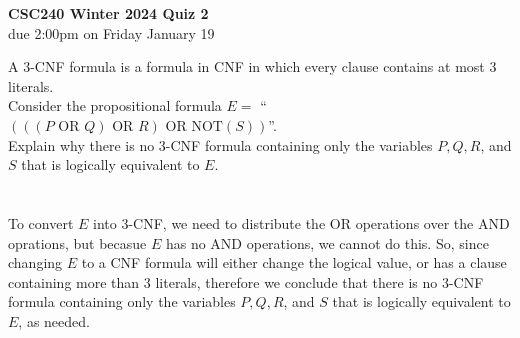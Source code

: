 \documentclass[11pt]{article}
\begin{document}
\begin{center}
{\bf \Large \bf CSC240 Winter 2024 Quiz 2}\\
due 2:00pm on Friday January 19 
\end{center}



A 3-CNF formula is a formula in CNF in which every clause contains at most 3 literals.\\

Consider the propositional formula  $E =$  ``$(((P \text{ OR } Q) \text{ OR } R) \text{ OR } \text{NOT}(S))$''.\\


Explain why there is no 3-CNF formula containing only the variables $P, Q, R$, and $S$
that is logically equivalent to $E$.\\\\\\

To convert $E$ into 3-CNF, we need to distribute the OR operations over the AND oprations, but becasue $E$ has no AND operations, we cannot do this. So, since changing $E$ to a CNF formula will either change the logical value, or has a clause containing more than 3 literals, therefore we conclude that there is no 3-CNF formula containing only the variables $P, Q, R$, and $S$ that is logically equivalent to $E$, as needed.
\end{document}
